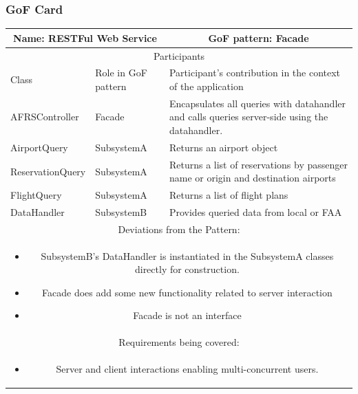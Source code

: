 \newpage

\subsubsection{GoF Card}

\begin{center}
    \begin{tabular}{ |p{4cm}|p{4cm}|p{7cm}|  }
        \hline
        \multicolumn{2}{|c|}{Name: RESTFul Web Service} & \multicolumn{1}{|c|}{GoF pattern: Facade} \\
        \hline
        \multicolumn{3}{|c|}{Participants} \\
        \hline
        Class & Role in GoF pattern & Participant's contribution in the context of the application \\
        \hline \hline

        AFRSController & Facade & Encapsulates all queries with datahandler and calls queries server-side using the datahandler. \\
        \hline
        AirportQuery & SubsystemA &
        Returns an airport object
        \\
        \hline
        ReservationQuery & SubsystemA &
        Returns a list of reservations by passenger name or origin and destination airports
        \\
        \hline
        FlightQuery & SubsystemA &
        Returns a list of flight plans
        \\
        \hline
        DataHandler & SubsystemB &
        Provides queried data from local or FAA
        \\
        \hline

        \hline
        \multicolumn{3}{|c|}{Deviations from the Pattern:} \\ \multicolumn{3}{|c|}{\parbox{0.9\textwidth}{
        \begin{itemize}
            \item SubsystemB’s DataHandler is instantiated in the SubsystemA classes directly for construction.
            \item Facade does add some new functionality related to server interaction
            \item Facade is not an interface
        \end{itemize} }} \\
        \hline
        \multicolumn{3}{|c|}{Requirements being covered:} \\ \multicolumn{3}{|c|}{\parbox{0.9\textwidth}{
        \begin{itemize}
            \item Server and client interactions enabling multi-concurrent users.
        \end{itemize} }} \\
        \hline
    \end{tabular}
\end{center}

